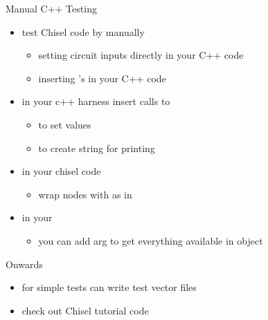 \documentclass[xcolor=pdflatex,dvipsnames,table]{beamer}
\begin{document}
\begin{frame}[fragile]{Manual C++ Testing}
\begin{itemize}
\item test Chisel code by manually 
\begin{itemize}
\item setting circuit inputs directly in your C++ code
\item inserting 's in your C++ code
\end{itemize}
\item in your c++ harness insert calls to
\begin{itemize}
\item {} to set values
\item {} to create string for printing
\end{itemize}
\item in your chisel code
\begin{itemize}
\item wrap nodes with  as in 
\end{itemize}
\item in your  
\begin{itemize}
\item you can add  arg to get everything available in object
\end{itemize}
\end{itemize}
\end{frame}



\begin{frame}[fragile]{Onwards}
\begin{itemize}
\item for simple tests can write test vector files
\item check out Chisel tutorial code
\end{itemize}
\end{frame}
\end{document}
